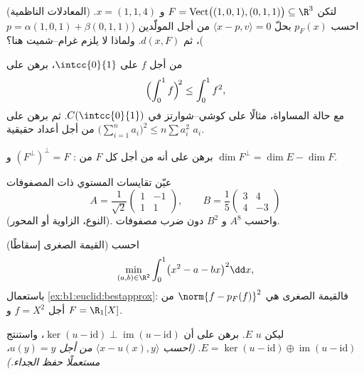 \begin{exercise}[$\star\star$]\label{exo:b1:euclid:5}
(المعادلات الناظمية) لتكن $F =
\operatorname{Vect}\bigl((1,0,1),(0,1,1)\bigr) \subseteq \R^3$ و
$x = (1, 1, 4)$. احسب $p_F(x)$ بحلّ $\langle x - p, v
\rangle = 0$ من أجل المولّدين ($p = \alpha(1,0,1) +
\beta(0,1,1)$)، ثم $d(x, F)$. ولماذا لا يلزم غرام--شميت
هنا؟
\end{exercise}

\begin{exercise}[$\star\star$]\label{exo:b1:euclid:6}
من أجل $f$  على $\intcc{0}{1}$، برهن على
\[
\Bigl(\int_0^1 f\Bigr)^{\!2} \leq \int_0^1 f^2 ,
\]
مع حالة المساواة، مثالًا على كوشي--شوارتز في
$C(\intcc{0}{1})$. ثم برهن على $\bigl(\sum_{i=1}^n a_i\bigr)^2 \leq
n \sum a_i^2$ من أجل أعداد حقيقية $a_i$.
\end{exercise}

\begin{exercise}[$\star\star$]\label{exo:b1:euclid:7}
برهن على أنه من أجل كل  $F$ من :
$(F^{\perp})^{\perp} = F$ و $\dim F^{\perp} = \dim E - \dim F$.
\end{exercise}

\begin{exercise}[$\star\star$]\label{exo:b1:euclid:8}
عيّن تقايسات المستوي ذات المصفوفات
\[
A = \frac{1}{\sqrt 2}\begin{pmatrix} 1 & -1\\ 1 & 1\end{pmatrix},
\qquad
B = \frac{1}{5}\begin{pmatrix} 3 & 4\\ 4 & -3\end{pmatrix}
\]
(النوع، الزاوية أو المحور). واحسب $A^8$ و $B^2$ دون
ضرب مصفوفات.
\end{exercise}

\begin{exercise}[$\star\star\star$]\label{exo:b1:euclid:9}
(القيمة الصغرى إسقاطًا) احسب
\[
\min_{(a, b) \in \R^2} \int_0^1 \bigl(x^2 - a - bx\bigr)^2 \dd x ,
\]
باستعمال \cref{ex:b1:euclid:bestapprox}: فالقيمة الصغرى هي $\norm{f -
p_F(f)}^2$ من أجل $f = X^2$ و $F = \R_1[X]$.
\end{exercise}

\begin{exercise}[$\star\star\star$]\label{exo:b1:euclid:10}
ليكن $u$   $E$. برهن على أن
$\ker(u - \mathrm{id}) \perp \operatorname{im}(u - \mathrm{id})$،
واستنتج $E = \ker(u - \mathrm{id}) \oplus \operatorname{im}(u -
\mathrm{id})$. \emph{(احسب $\langle x - u(x), y\rangle$ من أجل
$u(y) = y$، مستعملًا حفظ الجداء.)}
\end{exercise}

